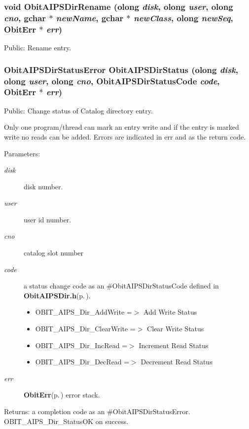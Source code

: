 \subsubsection{\setlength{\rightskip}{0pt plus 5cm}void Obit\-AIPSDir\-Rename ({\bf olong} {\em disk}, {\bf olong} {\em user}, {\bf olong} {\em cno}, gchar $\ast$ {\em new\-Name}, gchar $\ast$ {\em new\-Class}, {\bf olong} {\em new\-Seq}, {\bf Obit\-Err} $\ast$ {\em err})}\label{ObitAIPSDir_8h_a15}


Public: Rename entry. 

\subsubsection{\setlength{\rightskip}{0pt plus 5cm}Obit\-AIPSDir\-Status\-Error Obit\-AIPSDir\-Status ({\bf olong} {\em disk}, {\bf olong} {\em user}, {\bf olong} {\em cno}, Obit\-AIPSDir\-Status\-Code {\em code}, {\bf Obit\-Err} $\ast$ {\em err})}\label{ObitAIPSDir_8h_a18}


Public: Change status of Catalog directory entry. 

Only one program/thread can mark an entry write and if the entry is marked write no reads can be added. Errors are indicated in err and as the return code. \begin{Desc}
\item[Parameters:]
\begin{description}
\item[{\em disk}]disk number. \item[{\em user}]user id number. \item[{\em cno}]catalog slot number \item[{\em code}]a status change code as an \#Obit\-AIPSDir\-Status\-Code defined in {\bf Obit\-AIPSDir.h}{\rm (p.\,\pageref{ObitAIPSDir_8h})}. \begin{itemize}
\item OBIT\_\-AIPS\_\-Dir\_\-Add\-Write =$>$ Add Write Status \item OBIT\_\-AIPS\_\-Dir\_\-Clear\-Write =$>$ Clear Write Status \item OBIT\_\-AIPS\_\-Dir\_\-Inc\-Read =$>$ Increment Read Status \item OBIT\_\-AIPS\_\-Dir\_\-Dec\-Read =$>$ Decrement Read Status \end{itemize}
\item[{\em err}]{\bf Obit\-Err}{\rm (p.\,\pageref{structObitErr})} error stack. \end{description}
\end{Desc}
\begin{Desc}
\item[Returns:]a completion code as an \#Obit\-AIPSDir\-Status\-Error. OBIT\_\-AIPS\_\-Dir\_\-Status\-OK on success. \end{Desc}
